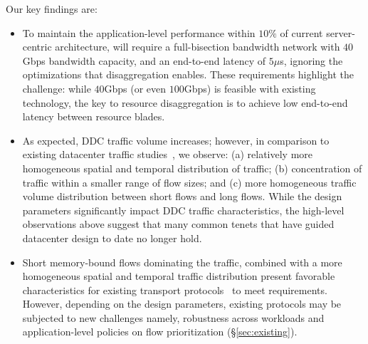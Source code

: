 Our key findings are:
\begin{itemize}[leftmargin=*]
	\itemsep0em
		\item To maintain the application-level performance within $10\%$ of current server-centric architecture, \dis will require a full-bisection bandwidth network with $40$Gbps bandwidth capacity, and an end-to-end latency of $5\mu$s, ignoring the optimizations that disaggregation enables. These requirements highlight the challenge: while $40$Gbps (or even $100$Gbps) is feasible with existing technology, the key to resource disaggregation is to achieve low end-to-end latency between resource blades.  
	    \item As expected, DDC traffic volume increases; however, in comparison to existing datacenter traffic studies~\cite{srikanth, theo}, we observe: (a) relatively more homogeneous spatial and temporal distribution of traffic; (b) concentration of traffic within a smaller range of flow sizes; and (c) more homogeneous traffic volume distribution between short flows and long flows. While the design parameters significantly impact DDC traffic characteristics, the high-level observations above suggest that many common tenets that have guided datacenter design to date no longer hold. 
        \item Short memory-bound flows dominating the \dis traffic, combined with a more homogeneous spatial and temporal traffic distribution present favorable characteristics for existing transport protocols~\cite{pfabric} to meet \dis requirements. However, depending on the design parameters, existing protocols may be subjected to new challenges namely, robustness across workloads and application-level policies on flow prioritization (\S\ref{sec:existing}).  
\end{itemize}

